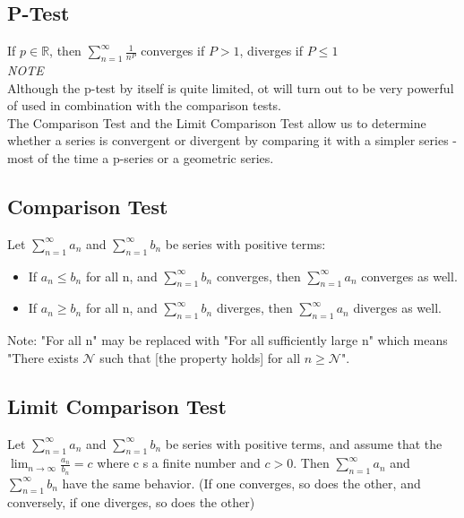 \documentclass[12pt, letterpaper]{article}
\begin{document}
        \subsection{P-Test}
            If $p \in \mathbb{R}$, then $\sum^{\infty}_{n = 1} \frac{1}{n^P}$ converges if $P > 1$, diverges if $P \leq 1$\\
            \textit{NOTE}\\
            Although the p-test by itself is quite limited, ot will turn out to be very powerful of used in combination with the comparison tests.\\
            The Comparison Test and the Limit Comparison Test allow us to determine whether a series is convergent or divergent by comparing it with a simpler series - 
            most of the time a p-series or a geometric series. 

        \subsection{Comparison Test}
            Let $\sum_{n = 1}^\infty a_n$ and $\sum_{n = 1}^\infty b_n$ be series with positive terms:
            \begin{itemize}
                \item If $a_n \leq b_n$ for all n, and $\sum_{n = 1}^\infty b_n$ converges, then $\sum_{n = 1}^\infty a_n$ converges as well.
                \item If $a_n \geq b_n$ for all n, and $\sum_{n = 1}^\infty b_n$ diverges, then $\sum_{n = 1}^\infty a_n$ diverges as well.
            \end{itemize}
            Note: "For all n" may be replaced with "For all sufficiently large n" which means "There exists $\mathcal{N}$ such that [the property holds] for all $n \geq \mathcal{N}$".
        \subsection{Limit Comparison Test}
            Let $\sum^{\infty}_{n = 1} a_n$ and $\sum^{\infty}_{n = 1} b_n$ be series with positive terms, and assume that the $\lim_{n \to \infty} \frac{a_n}{b_n} = c$ 
            where c s a finite number and $c>0$. Then $\sum^{\infty}_{n = 1} a_n$ and $\sum^{\infty}_{n = 1} b_n$ have the same behavior. (If one converges, so does the other, 
            and conversely, if one diverges, so does the other)
\end{document}

